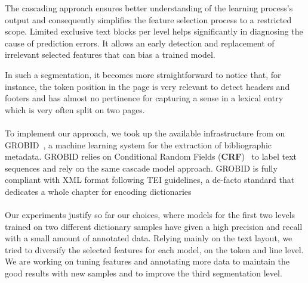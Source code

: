 \documentclass[twocolumn,a4paper]{article}
\begin{document}
 The cascading approach ensures better understanding of the learning process’s output and consequently simplifies the feature selection process to a restricted scope. Limited exclusive text blocks per level helps significantly in diagnosing the cause of prediction errors. It allows an early detection and replacement of irrelevant selected features that can bias a trained model.
					
In such a segmentation, it becomes more straightforward to notice that, for instance, the token position in the page is very relevant to detect headers and footers and has almost no pertinence for capturing a sense in a lexical entry which is very often split on two pages.
  




\paragraph{}To implement our approach, we took up the available infrastructure from on GROBID~\cite{Lopez2015GROBIDI}, a machine learning system for the extraction of bibliographic metadata. GROBID relies on Conditional Random Fields (\textbf{CRF})~\cite{lavergne2010practical} to label text sequences and rely on the same cascade model approach. GROBID is fully compliant with XML format following TEI guidelines, a de-facto standard that dedicates a whole chapter for encoding dictionaries~\cite{budin2012creating,romary:hal-00704511}
 
\paragraph{}Our experiments justify so far our choices, where models for the first two levels trained on two different dictionary samples have given a high precision and recall with a small amount of annotated data. Relying mainly on the text layout, we tried to diversify the selected features for each model, on the token and line level. We are working on tuning features and annotating more data to maintain the good results with new samples and to improve the third segmentation level.
\end{document}
